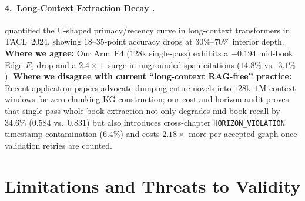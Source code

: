 \documentclass[11pt,twocolumn]{article}
\begin{document}
\paragraph{4.\ Long-Context Extraction Decay \citep{liu2024lost}.}
\citet{liu2024lost} quantified the U-shaped primacy/recency curve in long-context transformers in TACL~2024, showing $18\text{--}35$-point accuracy drops at $30\%\text{--}70\%$ interior depth. \textbf{Where we agree:} Our Arm~E4 ($128\text{k}$ single-pass) exhibits a $-0.194$ mid-book Edge $F_1$ drop and a $2.4\times+$ surge in ungrounded span citations ($14.8\%$ vs.\ $3.1\%$). \textbf{Where we disagree with current ``long-context RAG-free'' practice:} Recent application papers advocate dumping entire novels into $128\text{k--}1\text{M}$ context windows for zero-chunking KG construction; our cost-and-horizon audit proves that single-pass whole-book extraction not only degrades mid-book recall by $34.6\%$ ($0.584$ vs.\ $0.831$) but also introduces cross-chapter \texttt{HORIZON\_VIOLATION} timestamp contamination ($6.4\%$) and costs $2.18\times$ more per accepted graph once validation retries are counted.

\section{Limitations and Threats to Validity}
\label{sec:limitations}
\end{document}
